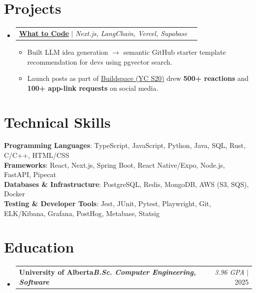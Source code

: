 \documentclass[letterpaper,11pt]{article}
\makeatletter
\newcommand{\resumeItem}[1]{\item\small{{#1 \vspace{-2pt}}}}
\newcommand{\resumeCompanyHeading}[2]{\vspace{-2pt}\item\begin{tabular*}{0.97\textwidth}[t]{l@{\extracolsep{\fill}}r}\textbf{#1} & #2 \\\end{tabular*}\vspace{-7pt}}
\newcommand{\resumeProjectHeading}[2]{\item\begin{tabular*}{0.97\textwidth}{l@{\extracolsep{\fill}}r}\small#1 & #2 \\\end{tabular*}\vspace{-7pt}}
\newcommand{\resumeSubHeadingListStart}{\begin{itemize}[leftmargin=0.15in, label={}]}
\newcommand{\resumeSubHeadingListEnd}{\end{itemize}}
\newcommand{\resumeItemListStart}{\begin{itemize}[leftmargin=0.22in,label=$\bullet$,itemsep=3pt]}
\newcommand{\resumeItemListEnd}{\end{itemize}\vspace{-5pt}}
\makeatother
\begin{document}
\section{Projects}
\resumeSubHeadingListStart
\resumeProjectHeading
{\textbf{\href{https://github.com/owencooke/what-to-code}{\underline{What to Code}}} $|$ \emph{Next.js, LangChain, Vercel, Supabase }}{}
\resumeItemListStart
\resumeItem{Built LLM idea generation $\rightarrow$ semantic GitHub starter template recommendation for devs using pgvector search.}
\resumeItem{Launch posts as part of \href{https://buildspace.so/}{\underline{Buildspace (YC S20)}} drew \textbf{500+ reactions} and \textbf{100+ app-link requests} on social media.}
\resumeItemListEnd
\resumeSubHeadingListEnd


\section{Technical Skills}
\begin{itemize}[leftmargin=0.15in, label={}]
\small{\item{
\textbf{Programming Languages}{: TypeScript, JavaScript, Python, Java, SQL, Rust, C/C++, HTML/CSS} \\
\textbf{Frameworks}{: React, Next.js, Spring Boot, React Native/Expo, Node.js, FastAPI, Pipecat} \\
\textbf{Databases \& Infrastructure}{: PostgreSQL, Redis, MongoDB, AWS (S3, SQS), Docker} \\
\textbf{Testing \& Developer Tools}{: Jest, JUnit, Pytest, Playwright, Git, ELK/Kibana, Grafana, PostHog, Metabase, Statsig}
}}
\end{itemize}

\section{Education}
\resumeSubHeadingListStart
\resumeCompanyHeading{University of Alberta\quad\textit{\small\mdseries B.Sc. Computer Engineering, Software}}{\textit{\small 3.96 GPA} $|$ 2025}
\resumeSubHeadingListEnd
\end{document}
